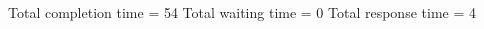 \begin{RTGrid}[width=0.8\textwidth]{5}{20}
\end{RTGrid}\newline\newline
Total completion time = 54\newline
Total waiting time = 0\newline
Total response time = 4\newline
